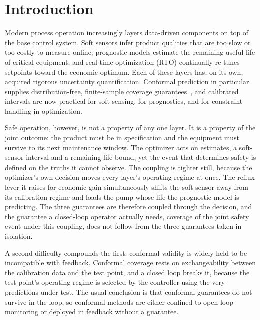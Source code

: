 \section{Introduction}
\label{sec:intro}

Modern process operation increasingly layers data-driven components on top of the base
control system. Soft sensors infer product qualities that are too slow or too costly to
measure online; prognostic models estimate the remaining useful life of critical
equipment; and real-time optimization (RTO) continually re-tunes setpoints toward the
economic optimum. Each of these layers has, on its own, acquired rigorous uncertainty
quantification. Conformal prediction in particular supplies distribution-free,
finite-sample coverage guarantees~\citep{vovk2005,shafer2008,angelopoulos2023}, and
calibrated intervals are now practical for soft sensing, for prognostics, and for
constraint handling in optimization.

Safe operation, however, is not a property of any one layer. It is a property of the
joint outcome: the product must be in specification and the equipment must survive to its
next maintenance window. The optimizer acts on estimates, a soft-sensor interval and a
remaining-life bound, yet the event that determines safety is defined on the truths it
cannot observe. The coupling is tighter still, because the optimizer's own decision moves
every layer's operating regime at once. The reflux lever it raises for economic gain
simultaneously shifts the soft sensor away from its calibration regime and loads the pump
whose life the prognostic model is predicting. The three guarantees are therefore coupled
through the decision, and the guarantee a closed-loop operator actually needs, coverage of
the joint safety event under this coupling, does not follow from the three guarantees
taken in isolation.

A second difficulty compounds the first: conformal validity is widely held to be
incompatible with feedback. Conformal coverage rests on exchangeability between the
calibration data and the test point, and a closed loop breaks it, because the test point's
operating regime is selected by the controller using the very predictions under test. The
usual conclusion is that conformal guarantees do not survive in the loop, so conformal
methods are either confined to open-loop monitoring or deployed in feedback without a
guarantee.

